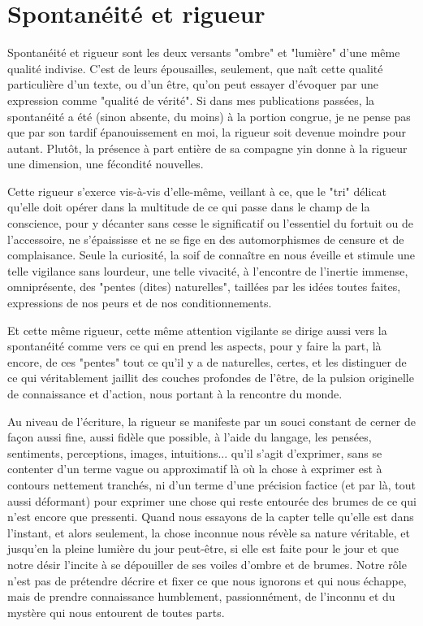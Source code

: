 \section{Spontanéité et rigueur}

Spontanéité et rigueur sont les deux versants "ombre" et "lumière" d'une même qualité indivise. C'est de leurs épousailles, seulement, que naît cette qualité particulière d'un texte, ou d'un être, qu'on peut essayer d'évoquer par une expression comme "qualité de vérité". Si dans mes publications passées, la spontanéité a été (sinon absente, du moins) à la portion congrue, je ne pense pas que par son tardif épanouissement en moi, la rigueur soit devenue moindre pour autant. Plutôt, la présence à part entière de sa compagne yin donne à la rigueur une dimension, une fécondité nouvelles.

Cette rigueur s'exerce vis-à-vis d'elle-même, veillant à ce, que le "tri" délicat qu'elle doit opérer dans la multitude de ce qui passe dans le champ de la conscience, pour y décanter sans cesse le significatif ou l'essentiel du fortuit ou de l'accessoire, ne s'épaississe et ne se fige en des automorphismes de censure et de complaisance. Seule la curiosité, la soif de connaître en nous éveille et stimule une telle vigilance sans lourdeur, une telle vivacité, à l'encontre de l'inertie immense, omniprésente, des "pentes (dites) naturelles", taillées par les idées toutes faites, expressions de nos peurs et de nos conditionnements.

Et cette même rigueur, cette même attention vigilante se dirige aussi vers la spontanéité comme vers ce qui en prend les aspects, pour y faire la part, là encore, de ces "pentes" tout ce qu'il y a de naturelles, certes, et les distinguer de ce qui véritablement jaillit des couches profondes de l'être, de la pulsion originelle de connaissance et d'action, nous portant à la rencontre du monde.

Au niveau de l'écriture, la rigueur se manifeste par un souci constant de cerner de façon aussi fine, aussi fidèle que possible, à l'aide du langage, les pensées, sentiments, perceptions, images, intuitions... qu'il s'agit d'exprimer, sans se contenter d'un terme vague ou approximatif là où la chose à exprimer est à contours nettement tranchés, ni d'un terme d'une précision factice (et par là, tout aussi déformant) pour exprimer une chose qui reste entourée des brumes de ce qui n'est encore que pressenti. Quand nous essayons de la capter telle qu'elle est dans l'instant, et alors seulement, la chose inconnue nous révèle sa nature véritable, et jusqu'en la pleine lumière du jour peut-être, si elle est faite pour le jour et que notre désir l'incite à se dépouiller de ses voiles d'ombre et de brumes. Notre rôle n'est pas de prétendre décrire et fixer ce que nous ignorons et qui nous échappe, mais de prendre connaissance humblement, passionnément, de l'inconnu et du mystère qui nous entourent de toutes parts.

